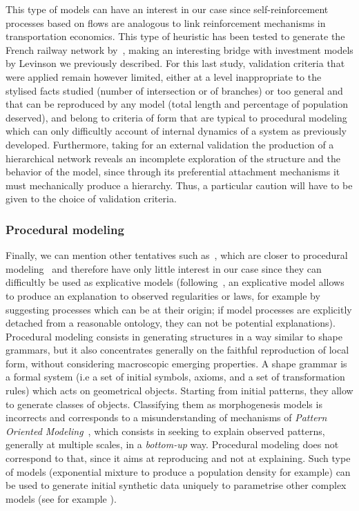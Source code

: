 \documentclass[10pt]{article}
\begin{document}
This type of models can have an interest in our case since self-reinforcement processes based on flows are analogous to link reinforcement mechanisms in transportation economics. This type of heuristic has been tested to generate the French railway network by~\cite{mimeur:tel-01451164}, making an interesting bridge with investment models by Levinson we previously described. For this last study, validation criteria that were applied remain however limited, either at a level inappropriate to the stylised facts studied (number of intersection or of branches) or too general and that can be reproduced by any model (total length and percentage of population deserved), and belong to criteria of form that are typical to procedural modeling which can only difficultly account of internal dynamics of a system as previously developed. Furthermore, taking for an external validation the production of a hierarchical network reveals an incomplete exploration of the structure and the behavior of the model, since through its preferential attachment mechanisms it must mechanically produce a hierarchy. Thus, a particular caution will have to be given to the choice of validation criteria.


\subsubsection{Procedural modeling}

Finally, we can mention other tentatives such as~\cite{de2007netlogo,yamins2003growing}, which are closer to procedural modeling~\cite{lechner2004procedural,watson2008procedural} and therefore have only little interest in our case since they can difficultly be used as explicative models (following~\cite{varenne2017theories}, an explicative model allows to produce an explanation to observed regularities or laws, for example by suggesting processes which can be at their origin; if model processes are explicitly detached from a reasonable ontology, they can not be potential explanations). Procedural modeling consists in generating structures in a way similar to shape grammars, but it also concentrates generally on the faithful reproduction of local form, without considering macroscopic emerging properties. A shape grammar is a formal system (i.e a set of initial symbols, axioms, and a set of transformation rules) which acts on geometrical objects. Starting from initial patterns, they allow to generate classes of objects. Classifying them as morphogenesis models is incorrects and corresponds to a misunderstanding of mechanisms of \emph{Pattern Oriented Modeling}~\cite{grimm2005pattern}, which consists in seeking to explain observed patterns, generally at multiple scales, in a \emph{bottom-up} way. Procedural modeling does not correspond to that, since it aims at reproducing and not at explaining. Such type of models (exponential mixture to produce a population density for example) can be used to generate initial synthetic data uniquely to parametrise other complex models (see for example \cite{raimbault2019second}).
\end{document}
